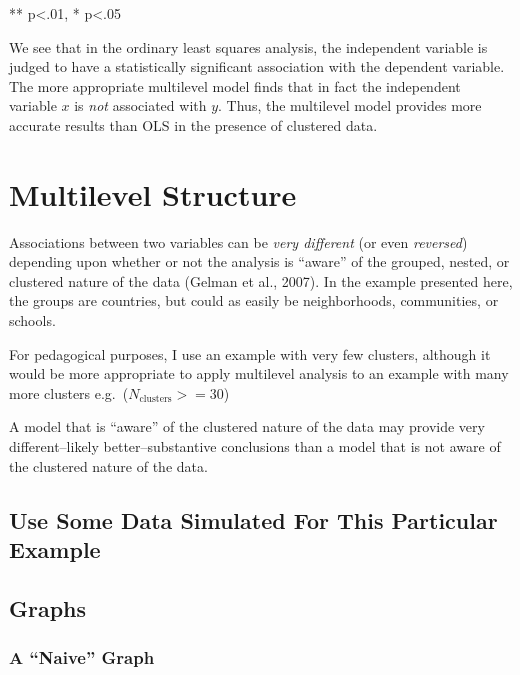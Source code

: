 \documentclass[
  letterpaper,
  DIV=11,
  numbers=noendperiod]{scrreprt}
\begin{document}
** p\textless.01, * p\textless.05

We see that in the ordinary least squares analysis, the independent
variable is judged to have a statistically significant association with
the dependent variable. The more appropriate multilevel model finds that
in fact the independent variable \(x\) is \emph{not} associated with
\(y\). Thus, the multilevel model provides more accurate results than
OLS in the presence of clustered data.

\hypertarget{sec-multilevelstructure}{%
\section{Multilevel Structure}\label{sec-multilevelstructure}}

Associations between two variables can be \emph{very different} (or even
\emph{reversed}) depending upon whether or not the analysis is ``aware''
of the grouped, nested, or clustered nature of the data (Gelman et al.,
2007). In the example presented here, the groups are countries, but
could as easily be neighborhoods, communities, or schools.

For pedagogical purposes, I use an example with very few clusters,
although it would be more appropriate to apply multilevel analysis to an
example with many more clusters e.g.~(\(N_\text{clusters} >= 30\))

A model that is ``aware'' of the clustered nature of the data may
provide very different--likely better--substantive conclusions than a
model that is not aware of the clustered nature of the data.

\hypertarget{use-some-data-simulated-for-this-particular-example}{%
\subsection{Use Some Data Simulated For This Particular
Example}\label{use-some-data-simulated-for-this-particular-example}}

\hypertarget{graphs}{%
\subsection{Graphs}\label{graphs}}

\hypertarget{a-naive-graph}{%
\subsubsection{A ``Naive'' Graph}\label{a-naive-graph}}
\end{document}
